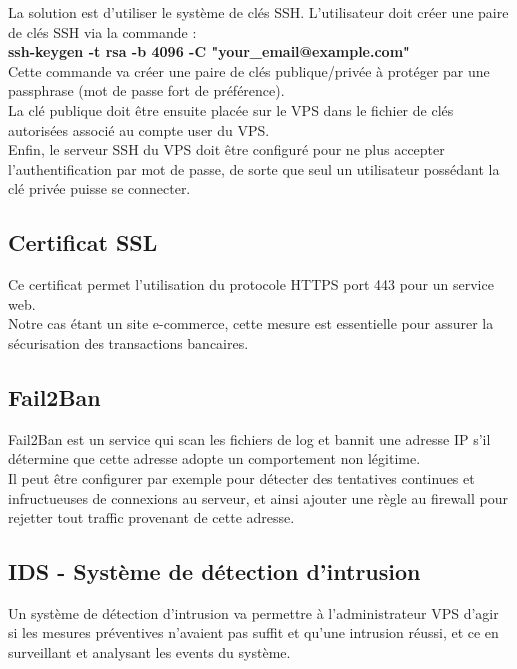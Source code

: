 \documentclass[a4paper,10pt,final,fleqn]{article}
\begin{document}
					La solution est d'utiliser le système de clés SSH. L'utilisateur doit créer une paire de clés SSH via la commande : \\

					\textbf{ssh-keygen -t rsa -b 4096 -C "your\_email@example.com"}\\

					Cette commande va créer une paire de clés publique/privée à protéger par une passphrase (mot de passe fort de préférence).\\
					La clé publique doit être ensuite placée sur le VPS dans le fichier de clés autorisées associé au compte user du VPS.\\

					Enfin, le serveur SSH du VPS doit être configuré pour ne plus accepter l'authentification par mot de passe, de sorte que seul un utilisateur possédant la clé privée puisse se connecter.\\

			\subsection{Certificat SSL}

				Ce certificat permet l'utilisation du protocole HTTPS port 443 pour un service web.\\
				Notre cas étant un site e-commerce, cette mesure est essentielle pour assurer la sécurisation des transactions bancaires.\\

			\subsection{Fail2Ban}

				Fail2Ban est un service qui scan les fichiers de log et bannit une adresse IP s'il détermine que cette adresse adopte un comportement non légitime.\\

				Il peut être configurer par exemple pour détecter des tentatives continues et infructueuses de connexions au serveur, et ainsi ajouter une règle au firewall pour rejetter tout traffic provenant de cette adresse.

			\subsection{IDS - Système de détection d'intrusion}

				Un système de détection d'intrusion va permettre à l'administrateur VPS d'agir si les mesures préventives n'avaient pas suffit et qu'une intrusion réussi, et ce en surveillant et analysant les events du système.\\
\end{document}
